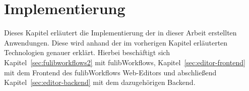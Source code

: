 \chapter{Implementierung}\label{ch:implementierung}
Dieses Kapitel erläutert die Implementierung der in dieser Arbeit erstellten Anwendungen.
Diese wird anhand der im vorherigen Kapitel erläuterten Technologien genauer erklärt.
Hierbei beschäftigt sich Kapitel~\ref{sec:fulibworkflows2} mit fulibWorkflows, Kapitel~\ref{sec:editor-frontend} mit dem Frontend des
fulibWorkflows Web-Editors und abschließend Kapitel~\ref{sec:editor-backend} mit dem dazugehörigen Backend.






